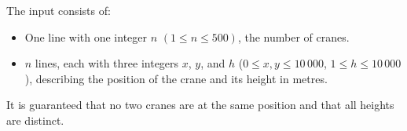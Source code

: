 
	The input consists of:
	\begin{itemize}
		\item One line with one integer $n$ $(1\leq n\leq500)$, the number of cranes.
		\item $n$ lines, each with three integers $x$, $y$, and $h$ ($0\leq x,y\leq 10\,000$, $1\leq h\leq 10\,000$), describing the position of the crane and its height in metres.
	\end{itemize}
	It is guaranteed that no two cranes are at the same position and that all heights are distinct.
